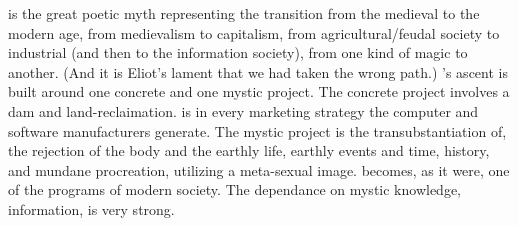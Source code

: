  is the great poetic myth representing the transition from the medieval to the modern age, from medievalism to capitalism, from agricultural\slash feudal society to industrial (and then to the information society), from one kind of magic to another. (And it is Eliot's lament that we had taken the wrong path.) 's ascent is built around one concrete and one mystic project. The concrete project involves a dam and land-reclaimation.  is in every marketing strategy the computer and software manufacturers generate. The mystic project is the transubstantiation of, the rejection of the body and the earthly life, earthly events and time, history, and mundane procreation, utilizing a meta-sexual image.  becomes, as it were, one of the programs of modern society. The dependance on mystic knowledge, information, is very strong.
